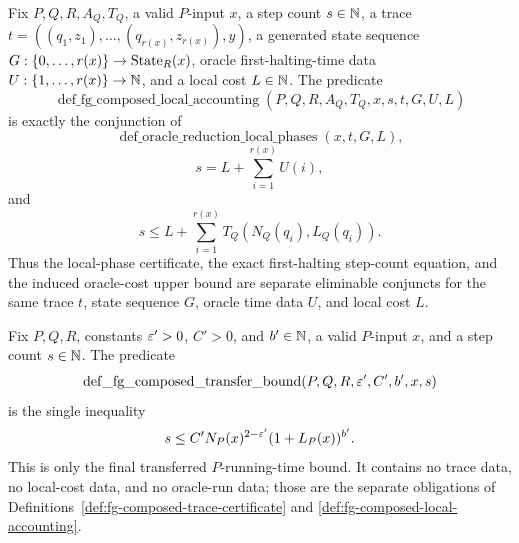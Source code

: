 \begin{definition}
  \label{def:fg-composed-local-accounting}
  Fix $P,Q,R,A_Q,T_Q$, a valid $P$-input $x$, a step count $s\in\mathbb{N}$, a trace
  $t=((q_1,z_1),\ldots,(q_{r(x)},z_{r(x)}),y)$, a generated state sequence
  $G:\{0,\ldots,r(x)\}\to\operatorname{State}_R(x)$, oracle first-halting-time data
  $U:\{1,\ldots,r(x)\}\to\mathbb{N}$, and a local cost $L\in\mathbb{N}$.  The predicate
  \[
    \operatorname{def\_fg\_composed\_local\_accounting}
      (P,Q,R,A_Q,T_Q,x,s,t,G,U,L)
  \]
  is exactly the conjunction of
  \[
    \operatorname{def\_oracle\_reduction\_local\_phases}(x,t,G,L),
  \]
  \[
    s=L+\sum_{i=1}^{r(x)}U(i),
  \]
  and
  \[
    s\leq
      L+\sum_{i=1}^{r(x)}T_Q(N_Q(q_i),L_Q(q_i)).
  \]
  Thus the local-phase certificate, the exact first-halting step-count
  equation, and the induced oracle-cost upper bound are separate eliminable
  conjuncts for the same trace $t$, state sequence $G$, oracle time data $U$,
  and local cost $L$.
\end{definition}

\begin{definition}
  \label{def:fg-composed-transfer-bound}
  Fix $P,Q,R$, constants $\varepsilon'>0$, $C'>0$, and $b'\in\mathbb{N}$, a valid $P$-input
  $x$, and a step count $s\in\mathbb{N}$.  The predicate
  \[
    \operatorname{def\_fg\_composed\_transfer\_bound}(P,Q,R,\varepsilon',C',b',x,s)
  \]
  is the single inequality
  \[
    s\leq C' N_P(x)^{2-\varepsilon'}(1+L_P(x))^{b'}.
  \]
  This is only the final transferred $P$-running-time bound.  It contains no
  trace data, no local-cost data, and no oracle-run data; those are the
  separate obligations of
  Definitions~\ref{def:fg-composed-trace-certificate} and
  \ref{def:fg-composed-local-accounting}.
\end{definition}

